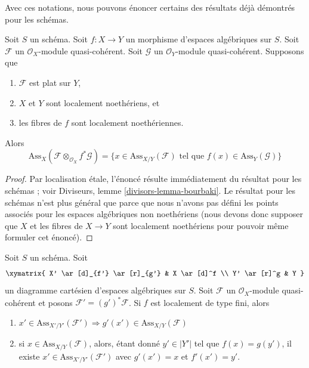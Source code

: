 \noindent
Avec ces notations, nous pouvons énoncer certains des résultats
déjà démontrés pour les schémas.

\begin{lemma}
\label{lemma-bourbaki}
Soit $S$ un schéma.
Soit $f : X \to Y$ un morphisme d'espaces algébriques sur $S$.
Soit $\mathcal{F}$ un $\mathcal{O}_X$-module quasi-cohérent.
Soit $\mathcal{G}$ un $\mathcal{O}_Y$-module quasi-cohérent.
Supposons que
\begin{enumerate}
\item $\mathcal{F}$ est plat sur $Y$,
\item $X$ et $Y$ sont localement noethériens, et
\item les fibres de $f$ sont localement noethériennes.
\end{enumerate}
Alors
$$
\text{Ass}_X(\mathcal{F} \otimes_{\mathcal{O}_X} f^*\mathcal{G}) =
\{x \in \text{Ass}_{X/Y}(\mathcal{F})\text{ tel que }
f(x) \in \text{Ass}_Y(\mathcal{G}) \}
$$
\end{lemma}

\begin{proof}
Par localisation \'etale, l'énoncé résulte immédiatement du résultat
pour les schémas ; voir
Diviseurs, lemme \ref{divisors-lemma-bourbaki}.
Le résultat pour les schémas n'est plus général que parce que
nous n'avons pas défini les points associés pour les
espaces algébriques non noethériens (nous devons donc supposer que $X$
et les fibres de $X \to Y$ sont localement noethériens pour pouvoir
même formuler cet énoncé).
\end{proof}

\begin{lemma}
\label{lemma-base-change-relative-assassin}
Soit $S$ un schéma. Soit
$$
\xymatrix{
X' \ar[d]_{f'} \ar[r]_{g'} & X \ar[d]^f \\
Y' \ar[r]^g & Y
}
$$
un diagramme cartésien d'espaces algébriques sur $S$.
Soit $\mathcal{F}$ un $\mathcal{O}_X$-module quasi-cohérent
et posons $\mathcal{F}' = (g')^*\mathcal{F}$.
Si $f$ est localement de type fini, alors
\begin{enumerate}
\item $x' \in \text{Ass}_{X'/Y'}(\mathcal{F}')
\Rightarrow g'(x') \in \text{Ass}_{X/Y}(\mathcal{F})$
\item si $x \in \text{Ass}_{X/Y}(\mathcal{F})$, alors, étant donné
$y' \in |Y'|$ tel que $f(x) = g(y')$, il existe
$x' \in \text{Ass}_{X'/Y'}(\mathcal{F}')$
avec $g'(x') = x$ et $f'(x') = y'$.
\end{enumerate}
\end{lemma}

